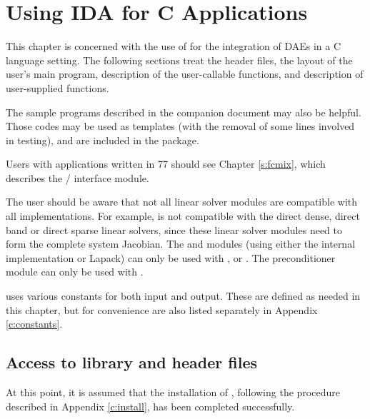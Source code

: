 \chapter{Using IDA for C Applications}\label{s:simulation}

This chapter is concerned with the use of {\ida} for the integration
of DAEs in a C language setting.  The following sections treat the header files,
the layout of the user's main program, description of the {\ida} user-callable
functions, and description of user-supplied functions.

The sample programs described in the companion document \cite{ida_ex} 
may also be helpful. Those codes may be used as templates (with the removal of
some lines involved in testing), and are included in the {\ida} package.

Users with applications written in {\F}77 should see Chapter \ref{s:fcmix},
which describes the {\F}/{\C} interface module.

The user should be aware that not all linear solver modules are compatible 
with all {\nvector} implementations. 
For example, {\nvecp} is not compatible with the direct dense, direct
band or direct sparse linear solvers, since these linear solver modules 
need to form the complete system Jacobian.  The {\idadense} and
{\idaband} modules (using either the internal implementation or
Lapack) can only be used with {\nvecs}, {\nvecopenmp} or {\nvecpthreads}. 
The preconditioner module {\idabbdpre} can only be used with {\nvecp}. 

{\ida} uses various constants for both input and output.  These are
defined as needed in this chapter, but for convenience are also listed
separately in Appendix \ref{c:constants}.

\section{Access to library and header files}\label{ss:file_access}

At this point, it is assumed that the installation of {\ida},
following the procedure described in Appendix \ref{c:install}, has
been completed successfully.

